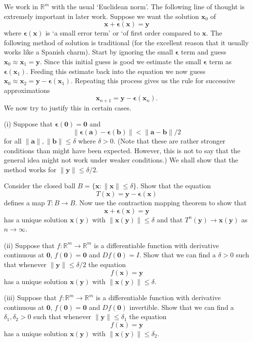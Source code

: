 \begin{question}
We work in ${\mathbb R}^{m}$
with the usual `Euclidean norm'.
The following line of thought is
extremely important in later work. Suppose
we want the solution ${\mathbf x}_{0}$  of
\[{\mathbf x}+{\boldsymbol\epsilon}({\mathbf x})=
{\mathbf y}\]
where ${\boldsymbol\epsilon}({\mathbf x})$ is 
`a small error term' or `of first order compared
to ${\mathbf x}$. The following method
of solution is traditional (for the excellent
reason that it usually works like a Spanish charm).
Start by ignoring the small ${\boldsymbol\epsilon}$
term and guess ${\mathbf x}_{0}\approx
{\mathbf x}_{1}={\mathbf y}$.
Since this initial guess is good we estimate
the small ${\boldsymbol\epsilon}$
term as
${\boldsymbol\epsilon}({\mathbf x}_{1})$.
Feeding this estimate back into the equation
we now guess ${\mathbf x}_{0}\approx
{\mathbf x}_{2}={\mathbf y}-{\boldsymbol\epsilon}({\mathbf x}_{1})$.
Repeating this process gives us the rule for
successive approximations
\[\mathbf{x}_{n+1}=\mathbf{y}-{\boldsymbol\epsilon}(\mathbf{x}_{n}).\]
We now try to justify this in certain cases.

(i) Suppose that ${\boldsymbol\epsilon}({\mathbf 0})={\mathbf 0}$
and 
\[\|{\boldsymbol\epsilon}({\mathbf a})-
{\boldsymbol\epsilon}({\mathbf b})\|
<\|{\mathbf a}-{\mathbf b}\|/2\]
for all $\|\mathbf{a}\|,\|\mathbf{b}\|\leq\delta$ where $\delta>0$.
(Note that these are rather stronger conditions
than might have been expected. However, this is not
to say that the general idea might not work under
weaker conditions.)
We shall show that the method works for $\|{\mathbf y}\|\leq\delta/2$.

Consider the closed ball 
$B=\{{\mathbf x}:\|{\mathbf x}\|\leq \delta\}$.
Show that the equation
\[T({\mathbf x})=\mathbf{y}-{\boldsymbol\epsilon}({\mathbf x})\]
defines a map $T:B\rightarrow B$. Now use the contraction
mapping theorem to show that
\[{\mathbf x}+{\boldsymbol\epsilon}({\mathbf x})=
{\mathbf y}\]
has a unique solution ${\mathbf x}(\mathbf{y})$ with
$\|{\mathbf x}(\mathbf{y})\|\leq\delta$ and that
$T^{n}({\mathbf y})\rightarrow {\mathbf x}(\mathbf{y})$
as $n\rightarrow\infty$.

(ii) Suppose that $f:{\mathbb R}^{m}\rightarrow{\mathbb R}^{m}$
is a differentiable function with derivative continuous
at ${\mathbf 0}$, $f({\mathbf 0})={\mathbf 0}$ 
and $Df({\mathbf 0})=I$. Show that
we can find a $\delta>0$ such that whenever
$\|{\mathbf y}\|\leq\delta/2$ the equation
\[f({\mathbf x})={\mathbf y}\]
has a unique solution ${\mathbf x}(\mathbf{y})$ with
$\|{\mathbf x}(\mathbf{y})\|\leq\delta$.

(iii) Suppose that $f:{\mathbb R}^{m}\rightarrow{\mathbb R}^{m}$
is a differentiable function
with derivative continuous
at ${\mathbf 0}$, $f({\mathbf 0})={\mathbf 0}$ 
and $Df({\mathbf 0})$ invertible. Show that
we can find a $\delta_{1},\delta_{2}>0$ such that whenever
$\|{\mathbf y}\|\leq\delta_{1}$ the equation
\[f({\mathbf x})={\mathbf y}\]
has a unique solution ${\mathbf x}(\mathbf{y})$ with
$\|{\mathbf x}(\mathbf{y})\|\leq\delta_{2}$.


\end{question}

